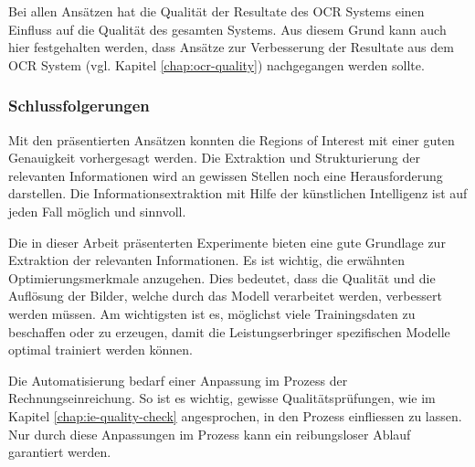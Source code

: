 
Bei allen Ansätzen hat die Qualität der Resultate des OCR Systems einen Einfluss auf die Qualität des gesamten Systems. Aus diesem Grund kann auch hier festgehalten werden, dass Ansätze zur Verbesserung der Resultate aus dem OCR System (vgl. Kapitel \ref{chap:ocr-quality}) nachgegangen werden sollte.




\subsubsection{Schlussfolgerungen}

Mit den präsentierten Ansätzen konnten die Regions of Interest mit einer guten Genauigkeit vorhergesagt werden. Die Extraktion und Strukturierung der relevanten Informationen wird an gewissen Stellen noch eine Herausforderung darstellen. Die Informationsextraktion mit Hilfe der künstlichen Intelligenz ist auf jeden Fall möglich und sinnvoll.

Die in dieser Arbeit präsenterten Experimente bieten eine gute Grundlage zur Extraktion der relevanten Informationen. Es ist wichtig, die erwähnten Optimierungsmerkmale anzugehen. Dies bedeutet, dass die Qualität und die Auflösung der Bilder, welche durch das Modell verarbeitet werden, verbessert werden müssen. Am wichtigsten ist es, möglichst viele Trainingsdaten zu beschaffen oder zu erzeugen, damit die Leistungserbringer spezifischen Modelle optimal trainiert werden können.

Die Automatisierung bedarf einer Anpassung im Prozess der Rechnungseinreichung. So ist es wichtig, gewisse Qualitätsprüfungen, wie im Kapitel \ref{chap:ie-quality-check} angesprochen, in den Prozess einfliessen zu lassen. Nur durch diese Anpassungen im Prozess kann ein reibungsloser Ablauf garantiert werden.
